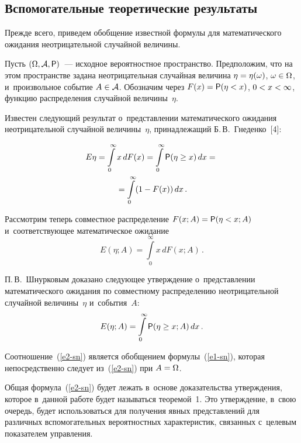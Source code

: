 \begin{multicols}{2}
\vspace*{-6pt}
  
\section{Вспомогательные теоретические результаты}

\vspace*{-2pt}

  Прежде всего, приведем обобщение известной формулы для 
математического ожидания неотрицательной случайной величины.
  
  Пусть $(\Omega, \mathcal{A}, {\sf P})$~--- исходное вероятностное пространство. 
Предположим, что на этом пространстве задана неотрицательная случайная 
величина $\eta\hm=\eta(\omega)$, $\omega\hm\in \Omega$, и~произвольное 
событие $A\hm\in \mathcal{A}$. Обозначим через $F(x)\hm= {\sf P}(\eta<x)$, $0\hm< 
x\hm<\infty$, функ\-цию распределения случайной величины~$\eta$.
  
  Известен следующий результат о~пред\-став\-ле\-нии математического ожидания 
неотрицательной случайной величины~$\eta$, при\-над\-ле\-жа\-щий 
Б.\,В.~Гне\-ден\-ко~[4]:

\noindent
  \begin{multline}
  E\eta=\int\limits_0^\infty x\,dF(x)=\int\limits_0^\infty {\sf P}(\eta\geq 
{x})\,dx={}\\
{}= \int\limits_0^\infty (1-F(x))\,dx\,.
  \label{e1-sn}
  \end{multline}
  
  Рассмотрим теперь совместное распределение $F(x;A)\hm= {\sf P}(\eta<x;A)$ 
и~соответствующее математическое ожидание
  $$
  E(\eta;A)=\int\limits_0^\infty x\,dF(x;A)\,.
  $$
  
  П.\,В.~Шнурковым доказано сле\-ду\-ющее утверж\-де\-ние о~пред\-став\-ле\-нии 
математического ожидания по совместному распределению неотрицательной 
случайной величины~$\eta$ и~события~$A$:
  \begin{equation}
  E(\eta;A)=\int\limits_0^\infty {\sf P}(\eta\geq {x};A)\,dx\,.
  \label{e2-sn}
  \end{equation}
  
  Соотношение~(\ref{e2-sn}) является обобщением формулы~(\ref{e1-sn}), 
которая непосредственно следует из~(\ref{e2-sn}) при $A\hm=\Omega$.
  
  Общая формула~(\ref{e2-sn}) будет лежать в~основе доказательства 
утверж\-де\-ния, которое в~данной работе будет называться тео\-ре\-мой~1. Это 
утверж\-де\-ние, в~свою очередь, будет использоваться для получения явных 
пред\-став\-ле\-ний для различных вспомогательных вероятностных характеристик, 
связанных с~целевым показателем управ\-ле\-ния.
  

\end{multicols}
